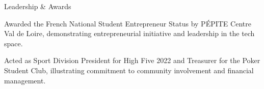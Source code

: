 \documentclass{resume} %
\begin{document}
\begin{rSection}{Leadership \& Awards} 
\vspace{-1.25em}
\item Awarded the French National Student Entrepreneur Status by PÉPITE Centre Val de Loire, demonstrating entrepreneurial initiative and leadership in the tech space.
\item Acted as Sport Division President for High Five 2022 and Treasurer for the Poker Student Club, illustrating commitment to community involvement and financial management.
\end{rSection}

\end{document}
